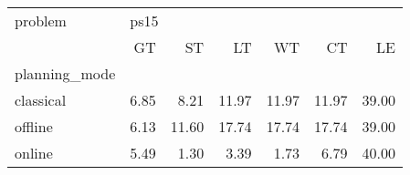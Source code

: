 \begin{tabular}{lrrrrrr}
\toprule
problem & \multicolumn{6}{l}{ps15} \\
{} &   GT &    ST &    LT &    WT &    CT &    LE \\
planning\_mode &      &       &       &       &       &       \\
\midrule
classical     & 6.85 &  8.21 & 11.97 & 11.97 & 11.97 & 39.00 \\
offline       & 6.13 & 11.60 & 17.74 & 17.74 & 17.74 & 39.00 \\
online        & 5.49 &  1.30 &  3.39 &  1.73 &  6.79 & 40.00 \\
\bottomrule
\end{tabular}

